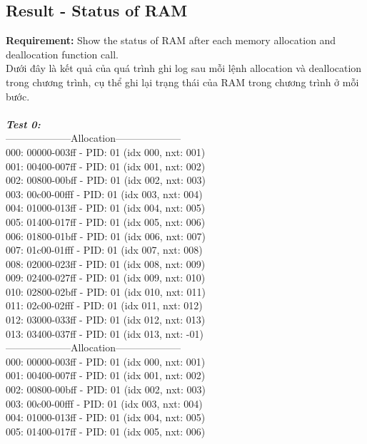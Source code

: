 \documentclass[10pt]{article}
\newcommand\tab[1][1cm]{\hspace*{#1}}
\begin{document}
\subsection{Result - Status of RAM}
\textbf{Requirement:} Show the status of RAM after each memory allocation and deallocation function call.\\
\tab[0.5cm] Dưới đây là kết quả của quá trình ghi log sau mỗi lệnh allocation và deallocation trong chương trình, cụ thể ghi lại trạng thái của RAM trong chương trình ở mỗi bước.\\ \\
\textbf{\textit{Test 0:}} \\
--------------------Allocation-------------------- \\
000: 00000-003ff - PID: 01 (idx 000, nxt: 001) \\
001: 00400-007ff - PID: 01 (idx 001, nxt: 002)\\ 
002: 00800-00bff - PID: 01 (idx 002, nxt: 003)\\
003: 00c00-00fff - PID: 01 (idx 003, nxt: 004)\\
004: 01000-013ff - PID: 01 (idx 004, nxt: 005)\\
005: 01400-017ff - PID: 01 (idx 005, nxt: 006)\\
006: 01800-01bff - PID: 01 (idx 006, nxt: 007)\\
007: 01c00-01fff - PID: 01 (idx 007, nxt: 008)\\
008: 02000-023ff - PID: 01 (idx 008, nxt: 009)\\
009: 02400-027ff - PID: 01 (idx 009, nxt: 010)\\
010: 02800-02bff - PID: 01 (idx 010, nxt: 011)\\
011: 02c00-02fff - PID: 01 (idx 011, nxt: 012)\\
012: 03000-033ff - PID: 01 (idx 012, nxt: 013)\\
013: 03400-037ff - PID: 01 (idx 013, nxt: -01)\\
--------------------Allocation-------------------- \\
000: 00000-003ff - PID: 01 (idx 000, nxt: 001)\\
001: 00400-007ff - PID: 01 (idx 001, nxt: 002)\\
002: 00800-00bff - PID: 01 (idx 002, nxt: 003)\\
003: 00c00-00fff - PID: 01 (idx 003, nxt: 004)\\
004: 01000-013ff - PID: 01 (idx 004, nxt: 005)\\
005: 01400-017ff - PID: 01 (idx 005, nxt: 006)\\
\end{document}
